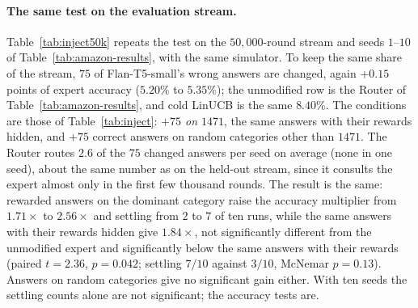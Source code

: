 \documentclass[anon]{alt2027} %
\begin{document}
\paragraph{The same test on the evaluation stream.}
Table~\ref{tab:inject50k} repeats the test on the $50{,}000$-round stream and
seeds $1$--$10$ of Table~\ref{tab:amazon-results}, with the same simulator.
To keep the same share of the stream, $75$ of Flan-T5-small's wrong answers
are changed, again $+0.15$ points of expert accuracy ($5.20\%$ to $5.35\%$);
the unmodified row is the Router of Table~\ref{tab:amazon-results}, and cold
LinUCB is the same $8.40\%$. The conditions are those of
Table~\ref{tab:inject}: \emph{$+75$ on $1471$}, the same answers with their
rewards hidden, and $+75$ correct answers on random categories other than
$1471$. The Router routes $2.6$ of the $75$ changed answers per seed on
average (none in one seed), about the same number as on the held-out stream,
since it consults the expert almost only in the first few thousand rounds.
The result is the same: rewarded answers on the dominant category raise the
accuracy multiplier from $1.71\times$ to $2.56\times$ and settling from $2$ to $7$ of
ten runs, while the same answers with their rewards hidden give $1.84\times$,
not significantly different from the unmodified expert and significantly
below the same answers with their rewards (paired $t=2.36$, $p=0.042$;
settling $7/10$ against $3/10$, McNemar $p=0.13$). Answers on random
categories give no significant gain either. With ten seeds the settling
counts alone are not significant; the accuracy tests are.

\begin{table}[h]
\centering
\caption{Changing $75$ of the expert's answers on the $50{,}000$-round
evaluation stream, seeds $1$--$10$. Tests are paired over the ten seeds
against the unmodified expert: a paired $t$-test on Router accuracy and an
exact McNemar test on whether the run settles on $1471$. Accuracy multipliers and
regret ratios are relative to cold LinUCB on the same seeds ($8.40\%$).}
\label{tab:inject50k}
\small
\setlength{\tabcolsep}{4pt}
\end{table}
\end{document}
